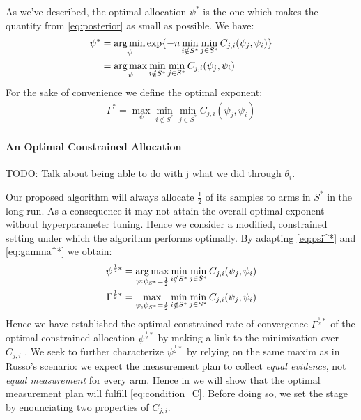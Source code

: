As we've described, the optimal allocation $\psi^*$ is the one which makes the quantity from \eqref{eq:posterior} as small as possible. We have:
\begin{align}
  \psi^* &= \operatorname*{arg\,min}_{\psi} \exp\{-n \min_{i \notin S^*}\min_{j \in S^*} C_{j, i}(\psi_j, \psi_i)\} \\
    &= \operatorname*{arg\,max}_{\psi} \min_{i \notin S^*}\min_{j \in S^*} C_{j, i}(\psi_j, \psi_i) \label{eq:psi^*}
\end{align}
For the sake of convenience we define the optimal exponent:
\begin{align}
  \Gamma^* = \max_{\psi} \min_{i \notin S^*}\min_{j \in S^*} C_{j, i}(\psi_j, \psi_i) \label{eq:gamma^*}
\end{align}

\paragraph{An Optimal Constrained Allocation}

TODO: Talk about being able to do with j what we did through $\theta_i$.

Our proposed algorithm will always allocate $\frac{1}{2}$ of its samples to arms in $S^*$ in the long run. As a consequence it may not attain the overall optimal exponent without hyperparameter tuning. Hence we consider a modified, constrained setting under which the algorithm performs optimally. By adapting \eqref{eq:psi^*} and \eqref{eq:gamma^*} we obtain:
\begin{align}
  \psi^{\frac{1}{2}*} &= \operatorname*{arg\,max}_{\psi: \psi_{S^*}=\frac{1}{2}} \min_{i \notin S^*}\min_{j \in S^*} C_{j, i}(\psi_j, \psi_i) \label{eq:constrained_optimal_psi}\\
  \Gamma^{\frac{1}{2}*} &= \max_{\psi, \psi_{S^*} = \frac{1}{2}} \min_{i \notin S^*} \min_{j \in S^*} C_{j, i}(\psi_j, \psi_i) \label{eq:constrained_optimal_gamma}
\end{align}
Hence we have established the optimal constrained rate of convergence $\Gamma^{\frac{1}{2}*}$ of the optimal constrained allocation $\psi^{\frac{1}{2}*}$ by making a link to the minimization over $C_{j, i}$ . We seek to further characterize $\psi^{\frac{1}{2}*}$ by relying on the same maxim as in Russo's scenario: we expect the measurement plan to collect \emph{equal evidence}, not \emph{equal measurement} for every arm. Hence in  we will show that the optimal measurement plan will fulfill \eqref{eq:condition_C}. Before doing so, we set the stage by enounciating two properties of $C_{j, i}$.


